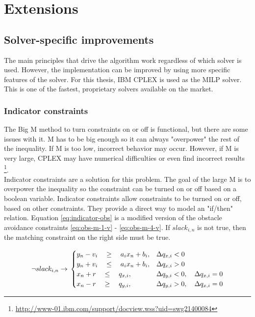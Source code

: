 \section{Extensions}
\label{section:extensions}

\subsection{Solver-specific improvements}
The main principles that drive the algorithm work regardless of which solver is used. However, the implementation can be improved by using more specific features of the solver. For this thesis, IBM CPLEX is used as the MILP solver. This is one of the fastest, proprietary solvers available on the market. 

\subsubsection{Indicator constraints}
The Big M method to turn constraints on or off is functional, but there are some issues with it. M has to be big enough so it can always "overpower" the rest of the inequality. If M is too low, incorrect behavior may occur. However, if M is very large, CPLEX may have numerical difficulties or even find incorrect results \footnote{\url{http://www-01.ibm.com/support/docview.wss?uid=swg21400084}}. \\
Indicator constraints are a solution for this problem. The goal of the large M is to overpower the inequality so the constraint can be turned on or off based on a boolean variable. Indicator constraints allow constraints to be turned on or off, based on other constraints. They provide a direct way to model an "if/then" relation. Equation \ref{eq:indicator-obs} is a modified version of the obstacle avoidance constraints \ref{eq:obs-m-1-v} - \ref{eq:obs-m-4-v}. If $slack_{i,n}$ is not true, then the matching constraint on the right side must be true.

\begin{equation}
\label{eq:indicator-obs}
\neg slack_{i,n} \rightarrow \\
\begin{cases}
y_{n} -  v_i \quad \geq 
\quad a_{i} x_{n} + b_{i},  	
& \Delta q_{x,i} < 0 							 	
 \\
y_{n} + v_i \quad \leq 
\quad a_{i} x_{n} + b_{i},
& \Delta q_{x,i} > 0 							 	
 \\
x_{n} + r \quad \leq
\quad  q_{x,i}, 		
& \Delta q_{y,i} < 0, \quad \Delta q_{x,i} = 0 	
 \\
x_{n} - r \quad \geq 
\quad q_{y,i},  		
& \Delta q_{y,i} > 0, \quad \Delta q_{x,i} = 0 	
\end{cases}
\end{equation}

